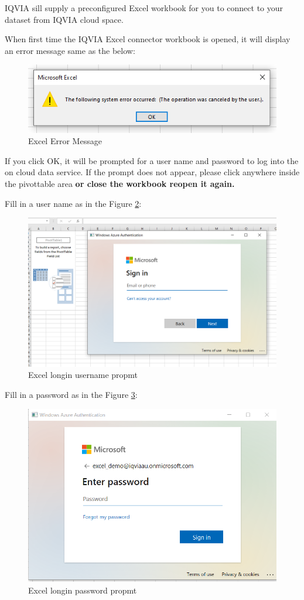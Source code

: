 \documentclass[]{article}
\begin{document}
IQVIA sill supply a preconfigured Excel workbook for you to connect to your dataset from IQVIA cloud space.

When first time the IQVIA Excel connector workbook is opened, it will display an error message same as the below:

\begin{figure}
\includegraphics[width=0.6\linewidth]{image/excel_error} \caption{Excel Error Message}\label{fig:login0}
\end{figure}

If you click OK, it will be prompted for a user name and password to log into the on cloud data service. If the prompt does not appear, please click anywhere inside the pivottable area \textbf{or close the workbook reopen it again.}

Fill in a user name as in the Figure \ref{fig:login1}:

\begin{figure}
\includegraphics[width=0.8\linewidth]{image/Excel1} \caption{Excel longin username propmt}\label{fig:login1}
\end{figure}

Fill in a password as in the Figure \ref{fig:login2}:

\begin{figure}
\includegraphics[width=0.8\linewidth]{image/Excel2} \caption{Excel longin password propmt}\label{fig:login2}
\end{figure}
\end{document}
